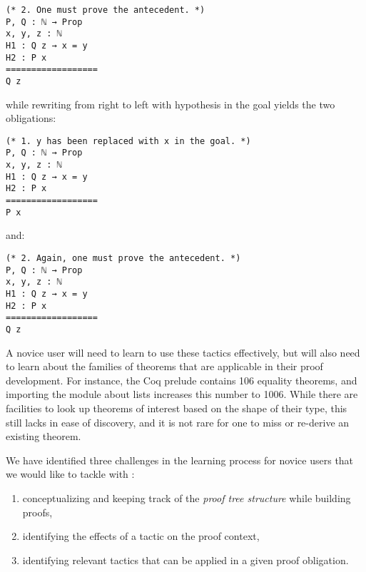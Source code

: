 \begin{verbatim}
(* 2. One must prove the antecedent. *)
P, Q : ℕ → Prop
x, y, z : ℕ
H1 : Q z → x = y
H2 : P x
==================
Q z
\end{verbatim}

while rewriting from right to left with hypothesis  in the goal
yields the two obligations:

\begin{verbatim}
(* 1. y has been replaced with x in the goal. *)
P, Q : ℕ → Prop
x, y, z : ℕ
H1 : Q z → x = y
H2 : P x
==================
P x
\end{verbatim}

and:

\begin{verbatim}
(* 2. Again, one must prove the antecedent. *)
P, Q : ℕ → Prop
x, y, z : ℕ
H1 : Q z → x = y
H2 : P x
==================
Q z
\end{verbatim}

A novice user will need to learn to use these tactics effectively, but will also
need to learn about the families of theorems that are applicable in their proof
development.  For instance, the Coq prelude contains 106 equality theorems, and
importing the module about lists increases this number to 1006.  While there are
facilities to look up theorems of interest based on the shape of their type,
this still lacks in ease of discovery, and it is not rare for one to miss or
re-derive an existing theorem.


We have identified three challenges in the learning process for novice users
that we would like to tackle with \PeaCoq{}:

\begin{enumerate}

  \item conceptualizing and keeping track of the \emph{proof tree structure}
while building proofs,

  \item identifying the effects of a tactic on the proof context,

  \item identifying relevant tactics that can be applied in a given proof
obligation.

\end{enumerate}
